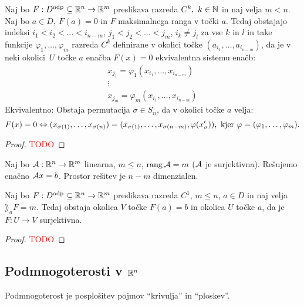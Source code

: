 \newpage
\begin{posledica}
    Naj bo $F: D^\text{odp} \subseteq \mathbb{R}^n \to \mathbb{R}^m$ preslikava razreda $C^k, \ k \in \mathbb{N}$ in naj velja $m < n$. Naj bo $a \in D, \ F(a) = 0$ in $F$ maksimalnega ranga v točki $a$. Tedaj obstajajo indeksi $i_1 < i_2 < \ldots < i_{n-m}$, $j_1 < j_2 < \ldots <j_m$, $i_k \neq j_l$ za vse $k$ in $l$ in take funkcije $\varphi_1, \ldots, \varphi_m$ razreda $C^k$ definirane v okolici točke $(a_{i_1}, \ldots, a_{i_{n-m}})$, da je v neki okolici~$U$ točke $a$ enačba $F(x) = 0$ ekvivalentna sistemu enačb: 
    \begin{align*}
        x_{j_1} = \varphi_1(x_{i_1}, \ldots, x_{i_{n-m}}) \\
        \vdots \\
        x_{j_m} = \varphi_m(x_{i_1}, \ldots, x_{i_{n-m}})
    \end{align*}
    Ekvivalentno: Obstaja permutacija $\sigma \in S_n$, da v okolici točke $a$ velja:
    $$F(x) = 0 \Leftrightarrow (x_{\sigma(1)}, \ldots, x_{\sigma(n)}) = (x_{\sigma(1)}, \ldots, x_{\sigma(n-m)}, \varphi(x_\sigma')), \text{ kjer } \varphi = (\varphi_1, \ldots, \varphi_m).$$
\end{posledica}

\begin{proof}
    \textcolor{red}{TODO}
\end{proof}

\begin{primer}
    Naj bo $\mathcal{A}: \mathbb{R}^n \to \mathbb{R}^m$ linearna, $m \leq n$, $\operatorname{rang} \mathcal{A} = m$ ($\mathcal{A}$ je surjektivna). Rešujemo enačno $\mathcal{A}x=b$. Prostor rešitev je $n-m$ dimenzialen.
\end{primer}

\begin{posledica}
    Naj bo $F: D^\text{odp} \subseteq \mathbb{R}^n \to \mathbb{R}^m$ preslikava razreda $C^1$, $m \leq n$, $a \in D$ in naj velja $\rang_aF=m$. Tedaj obstaja okolica $V$ točke $F(a) = b$ in okolica $U$ točke $a$, da je $F: U \to V$ surjektivna.
\end{posledica}

\begin{proof}
    \textcolor{red}{TODO}
\end{proof}

\subsection{Podmnogoterosti v $\mathbb{R}^n$}
Podmnogoterost je posplošitev pojmov "`krivulja"' in "`ploskev"'.

